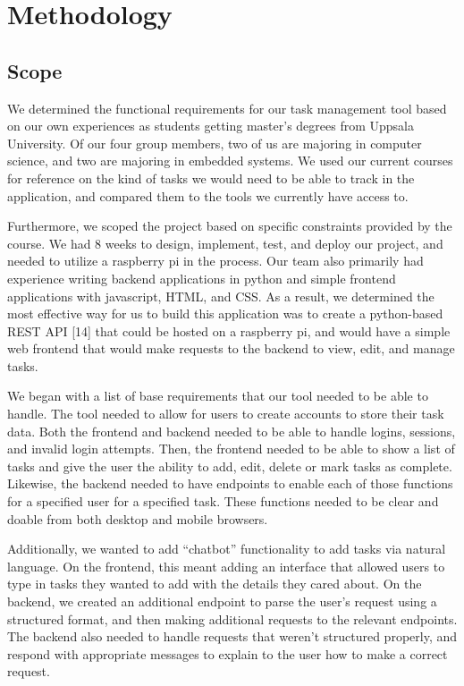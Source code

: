 \documentclass[11pt,oneside]{article}
\begin{document}
\section{Methodology}
\subsection{Scope}
We determined the functional requirements for our task management tool based on our own experiences as students getting master’s degrees from Uppsala University. Of our four group members, two of us are majoring in computer science, and two are majoring in embedded systems. We used our current courses for reference on the kind of tasks we would need to be able to track in the application, and compared them to the tools we currently have access to. 

Furthermore, we scoped the project based on specific constraints provided by the course. We had 8 weeks to design, implement, test, and deploy our project, and needed to utilize a raspberry pi in the process. Our team also primarily had experience writing backend applications in python and simple frontend applications with javascript, HTML, and CSS. As a result, we determined the most effective way for us to build this application was to create a python-based REST API [14] that could be hosted on a raspberry pi, and would have a simple web frontend that would make requests to the backend to view, edit, and manage tasks.

We began with a list of base requirements that our tool needed to be able to handle. The tool needed to allow for users to create accounts to store their task data. Both the frontend and backend needed to be able to handle logins, sessions, and invalid login attempts. Then, the frontend needed to be able to show a list of tasks and give the user the ability to add, edit, delete or mark tasks as complete. Likewise, the backend needed to have endpoints to enable each of those functions for a specified user for a specified task. These functions needed to be clear and doable from both desktop and mobile browsers.

Additionally, we wanted to add “chatbot” functionality to add tasks via natural language. On the frontend, this meant adding an interface that allowed users to type in tasks they wanted to add with the details they cared about. On the backend, we created an additional endpoint to parse the user’s request using a structured format, and then making additional requests to the relevant endpoints. The backend also needed to handle requests that weren’t structured properly, and respond with appropriate messages to explain to the user how to make a correct request. 
\end{document}
